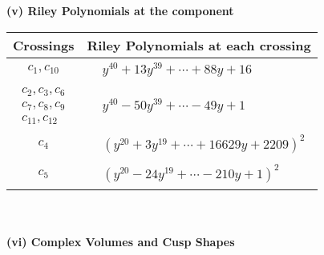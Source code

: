 \documentclass[1p]{elsarticle_modified}
\theoremstyle{definition}
\begin{document}
\newpage\renewcommand{\arraystretch}{1}
\flushleft \textbf{(v) Riley Polynomials at the component}\newline \\
\begin{tabular}{m{50pt}|m{274pt}}
Crossings & \hspace{64pt}Riley Polynomials at each crossing \\
\hline $$\begin{aligned}c_{1},c_{10}\end{aligned}$$&$\begin{aligned}
&y^{40}+13 y^{39}+\cdots+88 y+16
\end{aligned}$\\
\hline $$\begin{aligned}c_{2},c_{3},c_{6}\\c_{7},c_{8},c_{9}\\c_{11},c_{12}\end{aligned}$$&$\begin{aligned}
&y^{40}-50 y^{39}+\cdots-49 y+1
\end{aligned}$\\
\hline $$\begin{aligned}c_{4}\end{aligned}$$&$\begin{aligned}
&(y^{20}+3 y^{19}+\cdots+16629 y+2209)^{2}
\end{aligned}$\\
\hline $$\begin{aligned}c_{5}\end{aligned}$$&$\begin{aligned}
&(y^{20}-24 y^{19}+\cdots-210 y+1)^{2}
\end{aligned}$\\
\hline
\end{tabular}\\~\\
\newpage\flushleft \textbf{(vi) Complex Volumes and Cusp Shapes}
\end{document}
